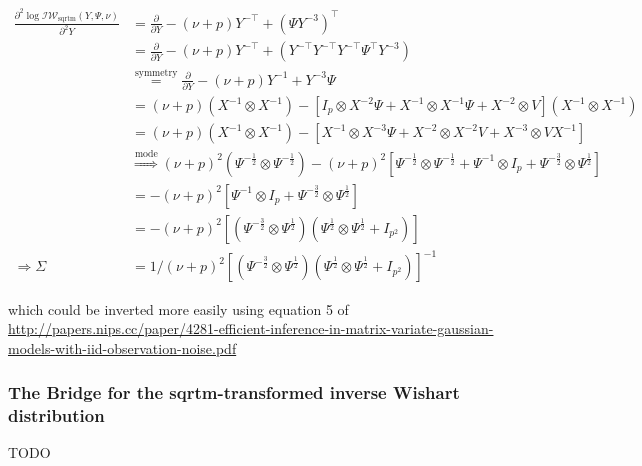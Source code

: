 \begin{subequations}
\begin{align}
	\frac{\partial^2 \log \mathcal{IW}_{\text{sqrtm}}(Y, \Psi, \nu)}{\partial^2 Y} &= \frac{\partial}{\partial Y} -(\nu + p)Y^{-\top} + (\Psi Y^{-3})^\top \\ 
	&= \frac{\partial}{\partial Y} -(\nu + p)Y^{-\top} + (Y^{-\top}Y^{-\top}Y^{-\top}\Psi^\top Y^{-3}) \\
	&\overset{\text{symmetry}}{=}\frac{\partial}{\partial Y} -(\nu + p)Y^{-1} + Y^{-3} \Psi \\
	&= (\nu + p)(X^{-1} \otimes X^{-1}) - [I_p \otimes X^{-2}\Psi + X^{-1} \otimes X^{-1}\Psi + X^{-2} \otimes V](X^{-1} \otimes X^{-1}) \\
	&= (\nu + p)(X^{-1} \otimes X^{-1}) - [X^{-1} \otimes X^{-3}\Psi + X^{-2} \otimes X^{-2}V + X^{-3} \otimes VX^{-1}]\\
	&\overset{\text{mode}}{\Rightarrow} (\nu + p)^2 (\Psi^{-\frac{1}{2}} \otimes \Psi^{-\frac{1}{2}}) - (\nu+p)^2[\Psi^{-\frac{1}{2}} \otimes \Psi^{-\frac{1}{2}} + \Psi^{-1} \otimes I_p + \Psi^{-\frac{3}{2}} \otimes \Psi^{\frac{1}{2}}] \\
	&= - (\nu+p)^2[\Psi^{-1} \otimes I_p + \Psi^{-\frac{3}{2}} \otimes \Psi^{\frac{1}{2}}] \\
	&= - (\nu+p)^2[(\Psi^{-\frac{3}{2}} \otimes \Psi^{\frac{1}{2}})(\Psi^{\frac{1}{2}} \otimes \Psi^{\frac{1}{2}} + I_{p^2})] \\
	\Rightarrow \Sigma &= 1/(\nu+p)^2 [(\Psi^{-\frac{3}{2}} \otimes \Psi^{\frac{1}{2}})(\Psi^{\frac{1}{2}} \otimes \Psi^{\frac{1}{2}} + I_{p^2})]^{-1}
\end{align}
\end{subequations}

which could be inverted more easily using equation 5 of \url{http://papers.nips.cc/paper/4281-efficient-inference-in-matrix-variate-gaussian-models-with-iid-observation-noise.pdf}

\subsubsection{The Bridge for the sqrtm-transformed inverse Wishart distribution}

TODO
